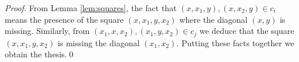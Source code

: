 \documentclass{article}
\newtheorem{example}{Example}
\begin{document}
	\begin{proof}
		From Lemma \ref{lem:squares}, the fact that $(x,x_1,y),(x,x_2,y) \in c_i$ means the presence of the square $(x,x_1,y,x_2)$ where the diagonal $(x,y)$ is missing.
		Similarly, from $(x_1,x,x_2),(x_1,y,x_2) \in c_j$ we deduce that the square $(x,x_1,y,x_2)$ is missing the diagonal $(x_1,x_2)$.
		Putting these facts together we obtain the thesis.\qed
	\end{proof}
	
	
	
	
\end{document}

